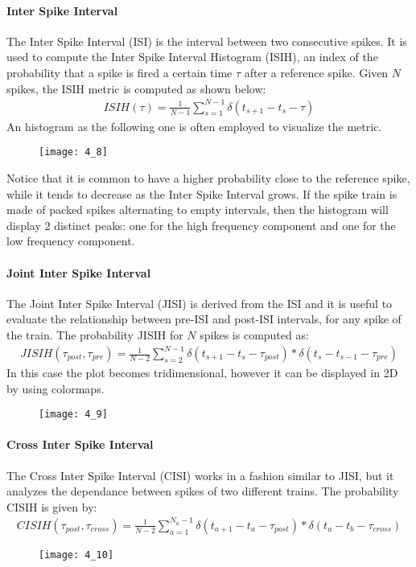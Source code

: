 \paragraph{Inter Spike Interval}
The Inter Spike Interval (ISI) is the interval between two consecutive spikes. It is used to compute
the Inter Spike Interval Histogram (ISIH), an index of the probability that a spike is fired
a certain time \(\tau\) after a reference spike.
Given \(N\) spikes, the ISIH metric is computed as shown below:
\begin{align*}
    ISIH(\tau)=\frac{1}{N-1}\sum_{s=1}^{N-1}\delta{(t_{s+1}-t_{s}-\tau)}
\end{align*}
An histogram as the following one is often employed to visualize the metric.
\begin{figure}[H]
    \texttt{[image: 4\_8]}
    \centering
\end{figure}
Notice that it is common to have a higher probability close to the reference spike, while it tends to
decrease as the Inter Spike Interval grows. If the spike train is made of packed spikes alternating
to empty intervals, then the histogram will display 2 distinct peaks: one for the high frequency
component and one for the low frequency component.
\paragraph{Joint Inter Spike Interval}
The Joint Inter Spike Interval (JISI) is derived from the ISI and it is useful to evaluate the
relationship between pre-ISI and post-ISI intervals, for any spike of the train.
The probability JISIH for \(N\) spikes is computed as:
\begin{align*}
    JISIH(\tau_{post},\tau_{pre})=\frac{1}{N-2}\sum_{s=2}^{N-1}\delta{(t_{s+1}-t_{s}-\tau_{post})}\ast \delta{(t_s-t_{s-1}-\tau_{pre})}
\end{align*}
In this case the plot becomes tridimensional, however it can be displayed in 2D by using
colormaps.
\begin{figure}[H]
    \texttt{[image: 4\_9]}
    \centering
\end{figure}
\paragraph{Cross Inter Spike Interval}
The Cross Inter Spike Interval (CISI) works in a fashion similar to JISI, but it analyzes the
dependance between spikes of two different trains. The probability CISIH is given by:
\begin{align*}
    CISIH(\tau_{post},\tau_{cross})=\frac{1}{N-2}\sum_{a=1}^{N_a-1}\delta{(t_{a+1}-t_{a}-\tau_{post})}\ast \delta{(t_a-t_b-\tau_{cross})}
\end{align*}
\begin{figure}[H]
    \texttt{[image: 4\_10]}
    \centering
\end{figure}


